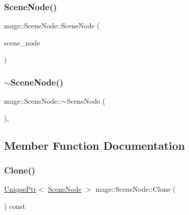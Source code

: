 \hypertarget{classmage_1_1_scene_node_acbf94ceadac62f2ccde13d70ce9298d7}{}\label{classmage_1_1_scene_node_acbf94ceadac62f2ccde13d70ce9298d7} 
\subsubsection{\texorpdfstring{Scene\+Node()}{SceneNode()}\hspace{0.1cm}{\footnotesize\ttfamily [3/3]}}
{\footnotesize\ttfamily mage\+::\+Scene\+Node\+::\+Scene\+Node (\begin{DoxyParamCaption}\item[{\hyperlink{classmage_1_1_scene_node}{Scene\+Node} \&\&}]{scene\+\_\+node }\end{DoxyParamCaption})\hspace{0.3cm}{\ttfamily [default]}}

\hypertarget{classmage_1_1_scene_node_a6705beea9c535de3d495762ed06e74dd}{}\label{classmage_1_1_scene_node_a6705beea9c535de3d495762ed06e74dd} 
\subsubsection{\texorpdfstring{$\sim$\+Scene\+Node()}{~SceneNode()}}
{\footnotesize\ttfamily mage\+::\+Scene\+Node\+::$\sim$\+Scene\+Node (\begin{DoxyParamCaption}{ }\end{DoxyParamCaption})\hspace{0.3cm}{\ttfamily [virtual]}, {\ttfamily [default]}}



\subsection{Member Function Documentation}
\hypertarget{classmage_1_1_scene_node_ae92f68ce03011b1c1d71421f077a00f8}{}\label{classmage_1_1_scene_node_ae92f68ce03011b1c1d71421f077a00f8} 
\subsubsection{\texorpdfstring{Clone()}{Clone()}}
{\footnotesize\ttfamily \hyperlink{namespacemage_a8c307fbcc33bce9b7f2aa4c26c3b95cf}{Unique\+Ptr}$<$ \hyperlink{classmage_1_1_scene_node}{Scene\+Node} $>$ mage\+::\+Scene\+Node\+::\+Clone (\begin{DoxyParamCaption}{ }\end{DoxyParamCaption}) const}

